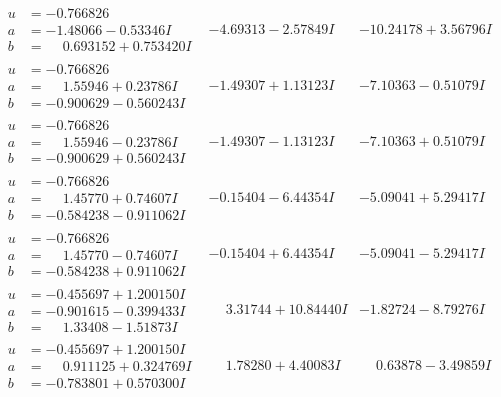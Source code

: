 \documentclass[1p]{elsarticle_modified}
\theoremstyle{definition}
\begin{document}
$$\begin{array}{c|c|c}
\begin{aligned}
u &= -0.766826\phantom{ +0.000000I} \\
a &= -1.48066 - 0.53346 I \\
b &= \phantom{-}0.693152 + 0.753420 I\end{aligned}
 & -4.69313 - 2.57849 I & -10.24178 + 3.56796 I \\ \hline\begin{aligned}
u &= -0.766826\phantom{ +0.000000I} \\
a &= \phantom{-}1.55946 + 0.23786 I \\
b &= -0.900629 - 0.560243 I\end{aligned}
 & -1.49307 + 1.13123 I & -7.10363 - 0.51079 I \\ \hline\begin{aligned}
u &= -0.766826\phantom{ +0.000000I} \\
a &= \phantom{-}1.55946 - 0.23786 I \\
b &= -0.900629 + 0.560243 I\end{aligned}
 & -1.49307 - 1.13123 I & -7.10363 + 0.51079 I \\ \hline\begin{aligned}
u &= -0.766826\phantom{ +0.000000I} \\
a &= \phantom{-}1.45770 + 0.74607 I \\
b &= -0.584238 - 0.911062 I\end{aligned}
 & -0.15404 - 6.44354 I & -5.09041 + 5.29417 I \\ \hline\begin{aligned}
u &= -0.766826\phantom{ +0.000000I} \\
a &= \phantom{-}1.45770 - 0.74607 I \\
b &= -0.584238 + 0.911062 I\end{aligned}
 & -0.15404 + 6.44354 I & -5.09041 - 5.29417 I \\ \hline\begin{aligned}
u &= -0.455697 + 1.200150 I \\
a &= -0.901615 - 0.399433 I \\
b &= \phantom{-}1.33408 - 1.51873 I\end{aligned}
 & \phantom{-}3.31744 + 10.84440 I & -1.82724 - 8.79276 I \\ \hline\begin{aligned}
u &= -0.455697 + 1.200150 I \\
a &= \phantom{-}0.911125 + 0.324769 I \\
b &= -0.783801 + 0.570300 I\end{aligned}
 & \phantom{-}1.78280 + 4.40083 I & \phantom{-}0.63878 - 3.49859 I\\

\end{array}$$
\end{document}
